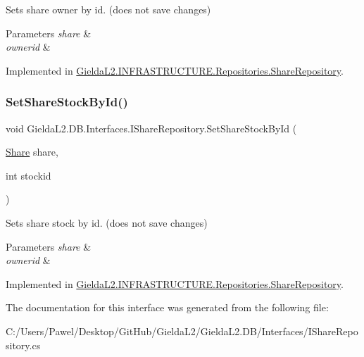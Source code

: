 Sets share owner by id. (does not save changes) 


\begin{DoxyParams}{Parameters}
{\em share} & \\
\hline
{\em ownerid} & \\
\hline
\end{DoxyParams}


Implemented in \mbox{\hyperlink{class_gielda_l2_1_1_i_n_f_r_a_s_t_r_u_c_t_u_r_e_1_1_repositories_1_1_share_repository_a6843f1b6e31ecc35b15c6b677ed098a9}{Gielda\+L2.\+I\+N\+F\+R\+A\+S\+T\+R\+U\+C\+T\+U\+R\+E.\+Repositories.\+Share\+Repository}}.

\mbox{\label{interface_gielda_l2_1_1_d_b_1_1_interfaces_1_1_i_share_repository_ac790aa8aa9cb7cbaeb91b0c6201abf76}} 
\subsubsection{\texorpdfstring{SetShareStockById()}{SetShareStockById()}}
{\footnotesize\ttfamily void Gielda\+L2.\+D\+B.\+Interfaces.\+I\+Share\+Repository.\+Set\+Share\+Stock\+By\+Id (\begin{DoxyParamCaption}\item[{\mbox{\hyperlink{class_gielda_l2_1_1_d_b_1_1_entities_1_1_share}{Share}}}]{share,  }\item[{int}]{stockid }\end{DoxyParamCaption})}



Sets share stock by id. (does not save changes) 


\begin{DoxyParams}{Parameters}
{\em share} & \\
\hline
{\em ownerid} & \\
\hline
\end{DoxyParams}


Implemented in \mbox{\hyperlink{class_gielda_l2_1_1_i_n_f_r_a_s_t_r_u_c_t_u_r_e_1_1_repositories_1_1_share_repository_a9ab77adf00ff67d057e01c6fa2c8278c}{Gielda\+L2.\+I\+N\+F\+R\+A\+S\+T\+R\+U\+C\+T\+U\+R\+E.\+Repositories.\+Share\+Repository}}.



The documentation for this interface was generated from the following file\+:\begin{DoxyCompactItemize}
\item 
C\+:/\+Users/\+Pawel/\+Desktop/\+Git\+Hub/\+Gielda\+L2/\+Gielda\+L2.\+D\+B/\+Interfaces/I\+Share\+Repository.\+cs\end{DoxyCompactItemize}
